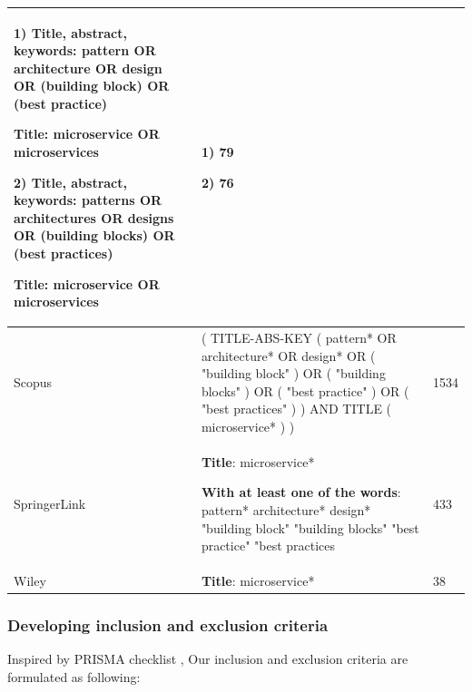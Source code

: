 \documentclass{bmcart}
\begin{document}
\begin{table}[h]
\begin{tabular}{|p{3cm}|p{7cm}|p{1.5cm}|}
        1) \textbf{Title, abstract, keywords}: pattern OR architecture OR design OR (building block) OR (best practice)

           \textbf{Title}: microservice OR microservices

        2) \textbf{Title, abstract, keywords}: patterns OR architectures OR designs OR (building blocks) OR (best practices)

            \textbf{Title}: microservice OR microservices
        & 
        1) 79

        2) 76
        \\ 

        \hline

        Scopus & ( TITLE-ABS-KEY ( pattern*  OR  architecture*  OR  design*  OR  ( "building block" )  OR  ( "building blocks" )  OR  ( "best practice" )  OR  ( "best practices" ) )  AND  TITLE ( microservice* ) ) & 1534 \\ 
        \hline

        SpringerLink & \textbf{Title}: microservice*


        \textbf{With at least one of the words}: pattern* architecture* design* "building block" "building blocks" "best practice" "best practices
         & 433 \\ 
        \hline

        Wiley & \textbf{Title}: microservice* & 38 \\ 

        \hline
    \end{tabular}
    
    \label{searchTerms}
\end{table}


\subsubsection{Developing inclusion and exclusion criteria} \label{incexc}

Inspired by PRISMA checklist \cite{tricco2018prisma}, Our inclusion and exclusion criteria are formulated as following:
\end{document}
